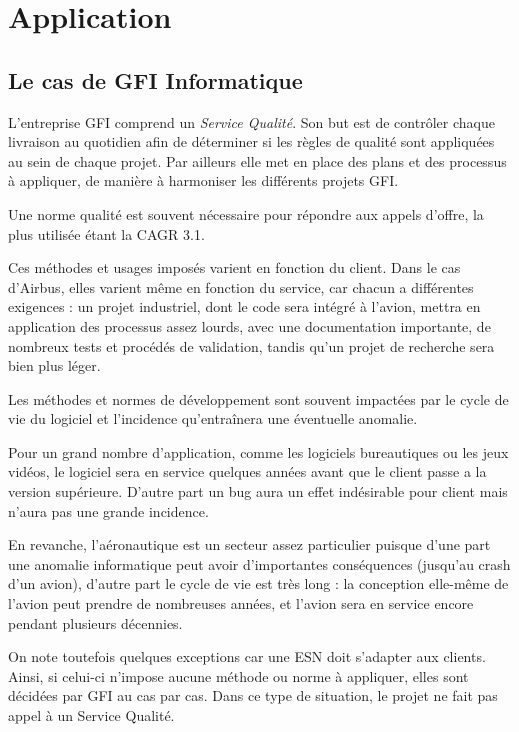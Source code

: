 \section{Application}

\subsection{Le cas de GFI Informatique}

L'entreprise GFI comprend un \textit{Service Qualité}. Son but est de contrôler chaque livraison au quotidien afin de déterminer si les règles de qualité sont appliquées au sein de chaque projet. Par ailleurs elle met en place des plans et des processus à appliquer, de manière à harmoniser les différents projets GFI.

Une norme qualité est souvent nécessaire pour répondre aux appels d'offre, la plus utilisée étant la CAGR 3.1.

Ces méthodes et usages imposés varient en fonction du client. Dans le cas d'Airbus, elles varient même en fonction du service, car chacun a différentes exigences : un projet industriel, dont le code sera intégré à l'avion, mettra en application des processus assez lourds, avec une documentation importante, de nombreux tests et procédés de validation, tandis qu'un projet de recherche sera bien plus léger.

Les méthodes et normes de développement sont souvent impactées par le cycle de vie du logiciel et l'incidence qu'entraînera une éventuelle anomalie.

Pour un grand nombre d'application, comme les logiciels bureautiques ou les jeux vidéos, le logiciel sera en service quelques années avant que le client passe a la version supérieure. D'autre part un bug aura un effet indésirable pour client mais n'aura pas une grande incidence.

En revanche, l'aéronautique est un secteur assez particulier puisque d'une part une anomalie informatique peut avoir d'importantes conséquences (jusqu'au crash d'un avion), d'autre part le cycle de vie est très long : la conception elle-même de l'avion peut prendre de nombreuses années, et l'avion sera en service encore pendant plusieurs décennies.

On note toutefois quelques exceptions car une \gls{ESN} doit s'adapter aux clients. Ainsi, si celui-ci n'impose aucune méthode ou norme à appliquer, elles sont décidées par GFI au cas par cas. Dans ce type de situation, le projet ne fait pas appel à un Service Qualité.

